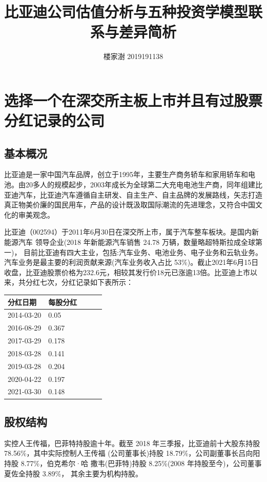\documentclass[UTF8]{ctexart}
\title{比亚迪公司估值分析与五种投资学模型联系与差异简析}
\author{楼家澍 2019191138}
\date{}
\begin{document}
\maketitle

\section{选择一个在深交所主板上市并且有过股票分红记录的公司}
\subsection{基本概况}
比亚迪是一家中国汽车品牌，创立于1995年，主要生产商务轿车和家用轿车和电池。由20多人的规模起步，2003年成长为全球第二大充电电池生产商，同年组建比亚迪汽车，比亚迪汽车遵循自主研发、自主生产、自主品牌的发展路线，矢志打造真正物美价廉的国民用车，产品的设计既汲取国际潮流的先进理念，又符合中国文化的审美观念。\par
比亚迪（002594）于2011年6月30日在深交所上市，属于汽车整车板块。是国内新能源汽车 领导企业(2018 年新能源汽车销售 24.78 万辆，数量略超特斯拉成全球第一)， 目前比亚迪有四大主业，包括:汽车业务、电池业务、电子业务和云轨业务。 汽车业务是最主要的利润贡献来源(汽车业务收入占比 53\%)。截止2021年6月15日收盘，比亚迪股票价格为232.6元，相较其发行价18元已涨逾13倍。比亚迪上市以来，共分红七次，分红记录如下表所示：
\begin{center}
\begin{table}[h]
\centering
\begin{tabular}{@{}lllll@{}}
\toprule
分红日期       & 每股分红  &  &  &  \\ \midrule
2014-03-20 & 0.05  &  &  &  \\
2016-08-29 & 0.367 &  &  &  \\
2017-03-29 & 0.178 &  &  &  \\
2018-03-28 & 0.141 &  &  &  \\
2019-03-28 & 0.204 &  &  &  \\
2020-04-22 & 0.197  &  &  &  \\
2021-03-30 & 0.148 &  &  &  \\ \bottomrule
\end{tabular}
\end{table}
\end{center}\par
\subsection{股权结构}
实控人王传福，巴菲特持股逾十年。截至 2018 年三季报，比亚迪前十大股东持股 78.56\%，其中实际控制人王传福 (公司董事长)持股 18.79\%，公司副董事长吕向阳持股 8.77\%，伯克希尔·哈 撒韦(巴菲特)持股 8.25\%(2008 年持股至今)，公司董事夏佐全持股 3.89\%， 其余主要为机构持股。\par
\end{document}
